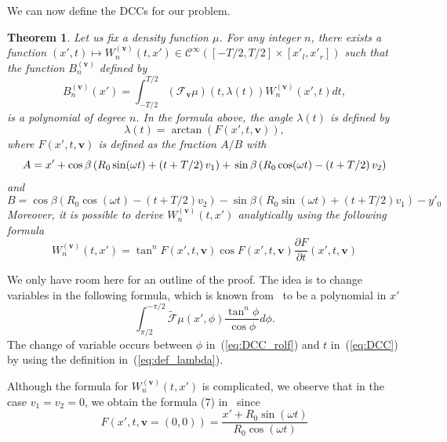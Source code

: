 \documentclass[twocolumn]{IEEEtran}
\newcommand{\Cinf}{\mathcal{C}^{\infty}}
\newcommand{\bv}{\mathbf{v}}
\newcommand{\Tbv}{\mathcal{F}_{\mathbf{v}}}
\newcommand{\Bnv}{B_n^{(\bv)}}
\newcommand{\Wnv}{W_n^{(\bv)}}
\newtheorem{theorem}{Theorem}
\begin{document}
We can now define the DCCs for our problem.
\begin{theorem}
\label{theo:main}
Let us fix a density function $\mu$. For any integer $n$, there exists a function $(x',t)\mapsto \Wnv(t,x') \in \Cinf \left( [-T/2,T/2] \times [x'_l,x'_r] \right)$ such that the function $\Bnv$ defined by
\begin{equation}
	\Bnv(x') = \int_{-T/2}^{T/2} \left( \Tbv \mu \right)\left( t,\lambda(t) \right) \Wnv(x',t) dt,
\label{eq:DCC}
\end{equation}
is a polynomial of degree $n$. In the formula above, the angle $\lambda(t)$ is defined by
\begin{equation}
	\lambda(t) = \arctan \left( F(x',t,\bv) \right),
\label{eq:def_lambda}
\end{equation}
where $F(x',t,\bv)$ is defined as the fraction $A/B$ with
\begin{dmath}
	A = x' + \cos \beta \left( R_0 \sin(\omega t) + \left( t + T/2 \right)v_1 \right) + \\
	\sin \beta \left( R_0 \cos(\omega t) - \left( t + T/2 \right)v_2 \right)
\end{dmath}
and
\begin{dmath}
	B = \cos \beta \left( R_0 \cos(\omega t) - \left( t + T/2 \right)v_2 \right) - \sin \beta \left( R_0 \sin(\omega t) + \left( t + T/2 \right)v_1 \right) - y'_0 
\end{dmath}
Moreover, it is possible to derive $\Wnv(t,x')$ analytically using the following formula
\begin{equation}
	\Wnv(t,x') = \tan^n F(x',t,\bv) \cos F(x',t,\bv) \frac{\partial F}{\partial t} (x',t,\bv)
\end{equation}
\end{theorem}

We only have room here for an outline of the proof. The idea is to change variables in the following formula, which is known from~\cite{clackdoyle2013necessary} to be a polynomial in $x'$
\begin{equation}
	\int_{\pi/2}^{-\pi/2} \tilde{\mathcal{F}}\mu (x',\phi) \frac{\tan^n \phi}{\cos \phi} d\phi.
\label{eq:DCC_rolf}
\end{equation}
The change of variable occurs between $\phi$ in~(\ref{eq:DCC_rolf}) and $t$ in~(\ref{eq:DCC}) by using the definition in~(\ref{eq:def_lambda}).

Although the formula for $\Wnv(t,x')$ is complicated, we observe that in the case $v_1=v_2=0$, we obtain the formula (7) in~\cite{clackdoyle2015consistency} since
\begin{equation}
	F \left( x',t,\bv = (0,0) \right) = \frac{x' + R_0 \sin(\omega t)}{R_0 \cos(\omega t)}
\end{equation}
\end{document}
